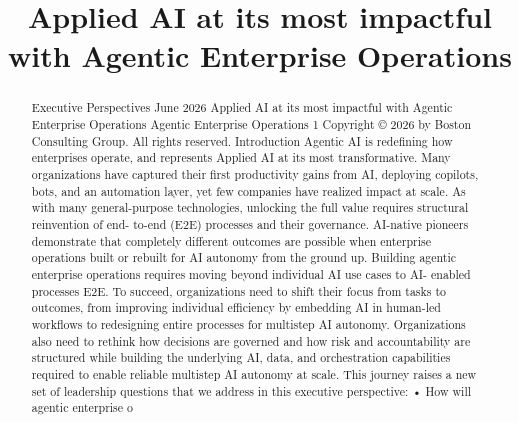 \title{Applied AI at its most impactful with Agentic Enterprise Operations}

\maketitle

\begin{abstract}
Executive Perspectives June 2026 Applied AI at its most impactful with Agentic Enterprise Operations Agentic Enterprise Operations 1 Copyright © 2026 by Boston Consulting Group. All rights reserved. Introduction Agentic AI is redefining how enterprises operate, and represents Applied AI at its most transformative. Many organizations have captured their first productivity gains from AI, deploying copilots, bots, and an automation layer, yet few companies have realized impact at scale. As with many general-purpose technologies, unlocking the full value requires structural reinvention of end- to-end (E2E) processes and their governance. AI-native pioneers demonstrate that completely different outcomes are possible when enterprise operations built or rebuilt for AI autonomy from the ground up. Building agentic enterprise operations requires moving beyond individual AI use cases to AI- enabled processes E2E. To succeed, organizations need to shift their focus from tasks to outcomes, from improving individual efficiency by embedding AI in human-led workflows to redesigning entire processes for multistep AI autonomy. Organizations also need to rethink how decisions are governed and how risk and accountability are structured while building the underlying AI, data, and orchestration capabilities required to enable reliable multistep AI autonomy at scale. This journey raises a new set of leadership questions that we address in this executive perspective: • How will agentic enterprise o
\end{abstract}

